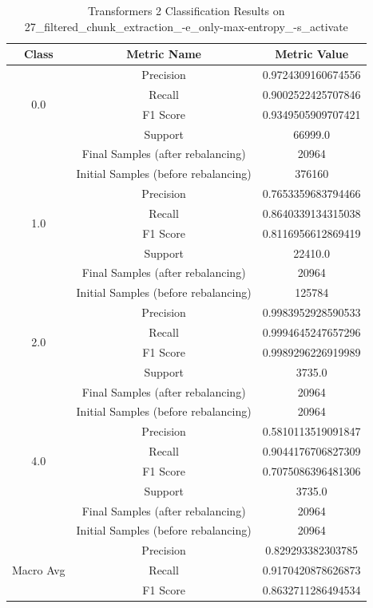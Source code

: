 \begin{longtable}{|c|c|c|}
\caption{Transformers 2 Classification Results on 27\_filtered\_chunk\_extraction\_-e\_only-max-entropy\_-s\_activate} \label{tab:27_filtered_chunk_extraction_-e_only-max-entropy_-s_activate_transformers_2_classifiers_results} \\
\hline
Class & Metric Name & Metric Value \\
\hline
\multirow{4}{*}{0.0} & Precision & 0.9724309160674556 \\
 & Recall & 0.9002522425707846 \\
 & F1 Score & 0.9349505909707421 \\
 & Support & 66999.0 \\
 & Final Samples (after rebalancing) & 20964 \\
 & Initial Samples (before rebalancing) & 376160 \\
\hline
\multirow{4}{*}{1.0} & Precision & 0.7653359683794466 \\
 & Recall & 0.8640339134315038 \\
 & F1 Score & 0.8116956612869419 \\
 & Support & 22410.0 \\
 & Final Samples (after rebalancing) & 20964 \\
 & Initial Samples (before rebalancing) & 125784 \\
\hline
\multirow{4}{*}{2.0} & Precision & 0.9983952928590533 \\
 & Recall & 0.9994645247657296 \\
 & F1 Score & 0.9989296226919989 \\
 & Support & 3735.0 \\
 & Final Samples (after rebalancing) & 20964 \\
 & Initial Samples (before rebalancing) & 20964 \\
\hline
\multirow{4}{*}{4.0} & Precision & 0.5810113519091847 \\
 & Recall & 0.9044176706827309 \\
 & F1 Score & 0.7075086396481306 \\
 & Support & 3735.0 \\
 & Final Samples (after rebalancing) & 20964 \\
 & Initial Samples (before rebalancing) & 20964 \\
\hline
\multirow{4}{*}{Macro Avg} & Precision & 0.829293382303785 \\
 & Recall & 0.9170420878626873 \\
 & F1 Score & 0.8632711286494534 \\

\end{longtable}
